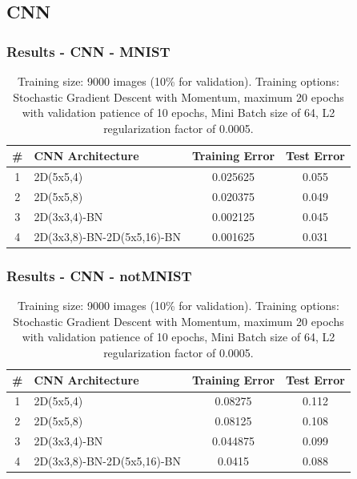 \documentclass{beamer}
\begin{document}
\subsection{CNN}

\begin{frame}
\frametitle{Results - CNN - MNIST}
\begin{table}[hbt]
  \begin{tabular}{|c|l|c|c|}
  	\hline
    \# & CNN Architecture & Training Error & Test Error\\
    \hline
    \hline
        1 & 2D(5x5,4)  &                 0.025625   &  0.055\\     
    2 & 2D(5x5,8)  &               0.020375  &   0.049  \\   
    3 & 2D(3x3,4)-BN      &          0.002125  &   0.045   \\  
    4 & 2D(3x3,8)-BN-2D(5x5,16)-BN      &        0.001625  &   0.031 \\
    \hline
  \end{tabular}
  \vspace{2em}
  \caption{{Training size: 9000 images (10\% for validation). Training options: Stochastic Gradient Descent with Momentum, maximum 20 epochs with validation patience of 10 epochs, Mini Batch size of 64, L2 regularization factor of 0.0005.}}
\end{table}
\end{frame}

\begin{frame}
\frametitle{Results - CNN - notMNIST}
\begin{table}[hbt]
  \begin{tabular}{|c|l|c|c|}
  	\hline
    \# & CNN Architecture & Training Error & Test Error\\
    \hline
    \hline
       1 & 2D(5x5,4)     &              0.08275   &  0.112  \\   
   2 & 2D(5x5,8)   &         0.08125     &0.108  \\   
    3 & 2D(3x3,4)-BN     &       0.044875    & 0.099 \\    
    4 & 2D(3x3,8)-BN-2D(5x5,16)-BN     &        0.0415    & 0.088   \\
    \hline
  \end{tabular}
  \vspace{2em}
  \caption{{Training size: 9000 images (10\% for validation). Training options: Stochastic Gradient Descent with Momentum, maximum 20 epochs with validation patience of 10 epochs, Mini Batch size of 64, L2 regularization factor of 0.0005.}}
\end{table}
\end{frame}
\end{document}
